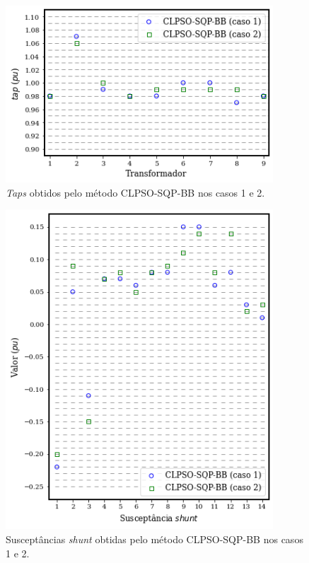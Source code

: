 \documentclass[
	12pt,				%
	openany,			%
	twoside,			%
	a4paper,			%
	chapter=TITLE,		%
	section=Title,		%
	subsection=Title,	%
	subsubsection=Title,%
	english,			%
	french,				%
	spanish,			%
	brazil			%
	]{abntex2}
\begin{document}
\begin{ERRATA}
\begin{figure}[h!]
\end{figure}


\begin{figure}[h!]
    \caption{\label{trafos11812}\emph{Taps} obtidos pelo método CLPSO-SQP-BB nos casos 1 e 2.}
    \centering
    \includegraphics[width=100mm]{images/trafos_ieee118_hibrido.png}
   
\end{figure}

\pagebreak

\begin{figure}[h!]
    \caption{\label{shunts11812}Susceptâncias \emph{shunt} obtidas pelo método CLPSO-SQP-BB nos casos 1 e 2.}
    \centering
    \includegraphics[width=100mm]{images/shunt_ieee118.png}
   
\end{figure}



\end{ERRATA}
\end{document}
